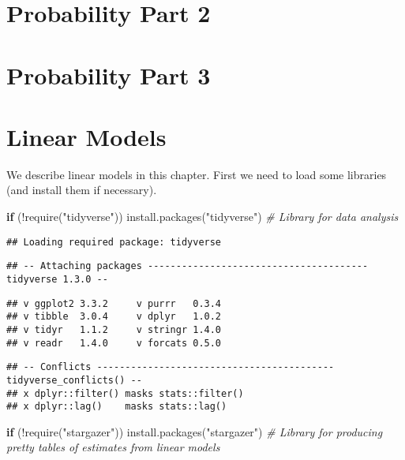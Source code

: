 \documentclass[
]{book}
\newenvironment{Shaded}{\begin{snugshade}}{\end{snugshade}}
\newcommand{\CommentTok}[1]{\textcolor[rgb]{0.56,0.35,0.01}{\textit{#1}}}
\newcommand{\ControlFlowTok}[1]{\textcolor[rgb]{0.13,0.29,0.53}{\textbf{#1}}}
\newcommand{\FunctionTok}[1]{\textcolor[rgb]{0.00,0.00,0.00}{#1}}
\newcommand{\NormalTok}[1]{#1}
\newcommand{\SpecialCharTok}[1]{\textcolor[rgb]{0.00,0.00,0.00}{#1}}
\newcommand{\StringTok}[1]{\textcolor[rgb]{0.31,0.60,0.02}{#1}}
\begin{document}
\hypertarget{probability-part-2}{%
\chapter{Probability Part 2}\label{probability-part-2}}

\hypertarget{probability-part-3}{%
\chapter{Probability Part 3}\label{probability-part-3}}

\hypertarget{linear-models}{%
\chapter{Linear Models}\label{linear-models}}

We describe linear models in this chapter. First we need to load some libraries (and install them if necessary).

\begin{Shaded}
\begin{Highlighting}[]
\ControlFlowTok{if}\NormalTok{ (}\SpecialCharTok{!}\FunctionTok{require}\NormalTok{(}\StringTok{"tidyverse"}\NormalTok{)) }\FunctionTok{install.packages}\NormalTok{(}\StringTok{"tidyverse"}\NormalTok{) }\CommentTok{\# Library for data analysis}
\end{Highlighting}
\end{Shaded}

\begin{verbatim}
## Loading required package: tidyverse
\end{verbatim}

\begin{verbatim}
## -- Attaching packages --------------------------------------- tidyverse 1.3.0 --
\end{verbatim}

\begin{verbatim}
## v ggplot2 3.3.2     v purrr   0.3.4
## v tibble  3.0.4     v dplyr   1.0.2
## v tidyr   1.1.2     v stringr 1.4.0
## v readr   1.4.0     v forcats 0.5.0
\end{verbatim}

\begin{verbatim}
## -- Conflicts ------------------------------------------ tidyverse_conflicts() --
## x dplyr::filter() masks stats::filter()
## x dplyr::lag()    masks stats::lag()
\end{verbatim}

\begin{Shaded}
\begin{Highlighting}[]
\ControlFlowTok{if}\NormalTok{ (}\SpecialCharTok{!}\FunctionTok{require}\NormalTok{(}\StringTok{"stargazer"}\NormalTok{)) }\FunctionTok{install.packages}\NormalTok{(}\StringTok{"stargazer"}\NormalTok{) }\CommentTok{\# Library for producing pretty tables of estimates from linear models}
\end{Highlighting}
\end{Shaded}
\end{document}
